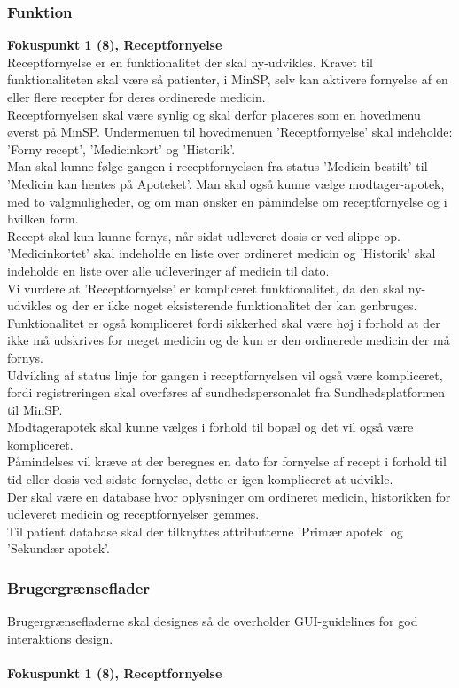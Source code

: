  \subsubsection{Funktion}  %
 \textbf{Fokuspunkt 1 (8), Receptfornyelse}\\
 Receptfornyelse er en funktionalitet der skal ny-udvikles. Kravet til funktionaliteten skal være så patienter, i MinSP, selv kan aktivere fornyelse af en eller flere recepter for deres ordinerede medicin. \\
 Receptfornyelsen skal være synlig og skal derfor placeres som en hovedmenu øverst på MinSP. Undermenuen til hovedmenuen 'Receptfornyelse' skal indeholde: 'Forny recept', 'Medicinkort' og 'Historik'.\\
 Man skal kunne følge gangen i receptfornyelsen fra status 'Medicin bestilt' til 'Medicin kan hentes på Apoteket'. Man skal også kunne vælge modtager-apotek, med to valgmuligheder, og om man ønsker en påmindelse om receptfornyelse og i hvilken form. \\ 
 Recept skal kun kunne fornys, når sidst udleveret dosis er ved slippe op.  \\
 'Medicinkortet' skal indeholde en liste over ordineret medicin og 'Historik' skal indeholde en liste over alle udleveringer af medicin til dato.\\
 Vi vurdere at 'Receptfornyelse' er kompliceret funktionalitet, da den skal ny-udvikles og der er ikke noget eksisterende funktionalitet der kan genbruges. Funktionalitet er også kompliceret fordi sikkerhed skal være høj i forhold at der ikke må udskrives for meget medicin og de kun er den ordinerede medicin der må fornys. \\
 Udvikling af status linje for gangen i receptfornyelsen vil også være kompliceret, fordi registreringen skal overføres af sundhedspersonalet fra Sundhedsplatformen til MinSP.\\
 Modtagerapotek skal kunne vælges i forhold til bopæl og det vil også være kompliceret. \\
 Påmindelses vil kræve at der beregnes en dato for fornyelse af recept i forhold til tid eller dosis ved sidste fornyelse, dette er igen kompliceret at udvikle.\\
 Der skal være en database hvor oplysninger om ordineret medicin, historikken for udleveret medicin og receptfornyelser gemmes. \\ 
 Til patient database skal der tilknyttes attributterne 'Primær apotek' og 'Sekundær apotek'.\\
 \subsubsection{Brugergrænseflader}
 Brugergrænsefladerne skal designes så de overholder GUI-guidelines for god interaktions design.
 \\\\  %
 \textbf{Fokuspunkt 1 (8), Receptfornyelse}

